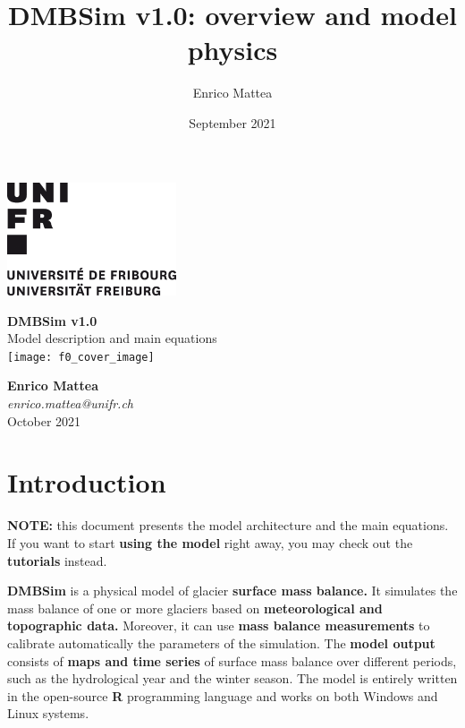 \documentclass[15pt]{extarticle}
\title{DMBSim v1.0: overview and model physics}
\author{Enrico Mattea}
\date{September 2021}
\begin{document}

\begin{titlepage}
    \includegraphics[width=5cm]{unifr_logo}
    \par
    \vspace{2.0cm}
	\centering
	{\huge\textbf{DMBSim v1.0\\}}
	\vspace{0.3 cm}
	{\large Model description and main equations\\}
	\vspace{1.6 cm}
	\texttt{[image: f0\_cover\_image]}\par
	\vspace{1.45 cm}
	{\normalsize \textbf{Enrico Mattea}\\}
	{\normalsize \textit{enrico.mattea@unifr.ch\\}}
	\vspace{0.6 cm}
	{\normalsize October 2021}
	\vfill

\end{titlepage}


\section{Introduction}
\textbf{NOTE:} this document presents the model architecture and the main equations. If you want to start \textbf{using the model} right away, you may check out the \textbf{tutorials} instead.

\textbf{DMBSim} is a physical model of glacier \textbf{surface mass balance.} It simulates the mass balance of one or more glaciers based on \textbf{meteorological and topographic data.} Moreover, it can use \textbf{mass balance measurements} to calibrate automatically the parameters of the simulation. The \textbf{model output} consists of \textbf{maps and time series} of surface mass balance over different periods, such as the hydrological year and the winter season. The model is entirely written in the open-source \textbf{R} programming language and works on both Windows and Linux systems.
\end{document}
